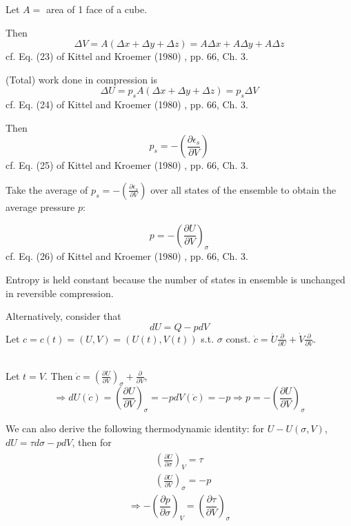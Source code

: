 \documentclass[10pt]{amsart}
\begin{document}
\begin{multicols*}{2}
Let $A = $ area of 1 face of a cube.

Then 
\[
\Delta V = A(\Delta x + \Delta y + \Delta z) = A\Delta x + A\Delta y + A\Delta z
\]
cf. Eq. (23) of Kittel and Kroemer (1980) \cite{CKittelHKroemer1980}, pp. 66, Ch. 3. 

(Total) work done in compression is 
\[
\Delta U = p_s A(\Delta x + \Delta y + \Delta z) = p_s \Delta V
\]
cf. Eq. (24) of Kittel and Kroemer (1980) \cite{CKittelHKroemer1980}, pp. 66, Ch. 3. 

Then 
\[
p_s = - \left( \frac{ \partial \epsilon_s }{ \partial V} \right) 
\]
cf. Eq. (25) of Kittel and Kroemer (1980) \cite{CKittelHKroemer1980}, pp. 66, Ch. 3. 

Take the average of $p_s = -\left( \frac{\partial \epsilon_s }{ \partial V} \right)$ over all states of the ensemble to obtain the average pressure $p$:

\begin{equation}
\boxed{ p = - \left( \frac{ \partial U}{ \partial V} \right)_{\sigma} }
\end{equation}
cf. Eq. (26) of Kittel and Kroemer (1980) \cite{CKittelHKroemer1980}, pp. 66, Ch. 3. 

Entropy is held constant because the number of states in ensemble is unchanged in reversible compression.

Alternatively, consider that 
\[
dU = Q - pdV
\]
Let $c= c(t) = (U,V) = (U(t), V(t))$ s.t. $\sigma$ const. $\dot{c} = \dot{U} \frac{ \partial }{\partial U} + \dot{V} \frac{ \partial }{ \partial V}$.

\quad \\ 
Let $t=V$. Then $\dot{c} = \left(\frac{\partial U}{\partial V} \right)_{\sigma} + \frac{\partial}{\partial V}$, 
\begin{equation}
\Longrightarrow dU(\dot{c}) = \left( \frac{ \partial U}{ \partial V} \right)_{\sigma} = -pdV (\dot{c}) = -p \Longrightarrow \boxed{ p = - \left( \frac{ \partial U}{ \partial V} \right)_{\sigma} }
\end{equation} 

We can also derive the following thermodynamic identity: for $U- U(\sigma, V)$, $dU = \tau d\sigma - pdV$, then for
\[
\begin{gathered}
\begin{aligned}
& \left( \frac{ \partial U}{ \partial \sigma} \right)_V = \tau \\
& \left( \frac{ \partial U}{ \partial V} \right)_{\sigma}  = -p 
\end{aligned}
\end{gathered}
\]
\begin{equation}
\Longrightarrow \boxed{ - \left( \frac{ \partial p }{ \partial \sigma} \right)_V =  \left( \frac{ \partial \tau}{ \partial V} \right)_{\sigma} } 
\end{equation}


\end{multicols*}
\end{document}
